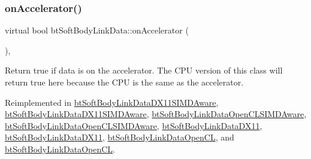 \mbox{\label{classbtSoftBodyLinkData_ae284c2a182ddf82dde057a8c2eb17ac3}} 
\subsubsection{\texorpdfstring{on\+Accelerator()}{onAccelerator()}\hspace{0.1cm}{\footnotesize\ttfamily [1/2]}}
{\footnotesize\ttfamily virtual bool bt\+Soft\+Body\+Link\+Data\+::on\+Accelerator (\begin{DoxyParamCaption}{ }\end{DoxyParamCaption})\hspace{0.3cm}{\ttfamily [inline]}, {\ttfamily [virtual]}}

Return true if data is on the accelerator. The C\+PU version of this class will return true here because the C\+PU is the same as the accelerator. 

Reimplemented in \hyperlink{classbtSoftBodyLinkDataDX11SIMDAware_acc8a4475c093d0caf3da6e104ad33f5d}{bt\+Soft\+Body\+Link\+Data\+D\+X11\+S\+I\+M\+D\+Aware}, \hyperlink{classbtSoftBodyLinkDataDX11SIMDAware_a3e740fcbea59c3d0b79f27df3fe8c40d}{bt\+Soft\+Body\+Link\+Data\+D\+X11\+S\+I\+M\+D\+Aware}, \hyperlink{classbtSoftBodyLinkDataOpenCLSIMDAware_a5016c89bbdf9c87283c138d629f34601}{bt\+Soft\+Body\+Link\+Data\+Open\+C\+L\+S\+I\+M\+D\+Aware}, \hyperlink{classbtSoftBodyLinkDataOpenCLSIMDAware_a0b6e6e7c88ca01fcb83160bfec42ecbe}{bt\+Soft\+Body\+Link\+Data\+Open\+C\+L\+S\+I\+M\+D\+Aware}, \hyperlink{classbtSoftBodyLinkDataDX11_a3138e6cb78bf8dac4786a3c45b26d5b8}{bt\+Soft\+Body\+Link\+Data\+D\+X11}, \hyperlink{classbtSoftBodyLinkDataDX11_a97835c62006c461555d41c61af626f17}{bt\+Soft\+Body\+Link\+Data\+D\+X11}, \hyperlink{classbtSoftBodyLinkDataOpenCL_a3e97987329d5a5e7a4a51523fa9d4651}{bt\+Soft\+Body\+Link\+Data\+Open\+CL}, and \hyperlink{classbtSoftBodyLinkDataOpenCL_a6cd4ec2a4127d48feff5c2cb46be5d52}{bt\+Soft\+Body\+Link\+Data\+Open\+CL}.

\mbox{\label{classbtSoftBodyLinkData_ae284c2a182ddf82dde057a8c2eb17ac3}} 
